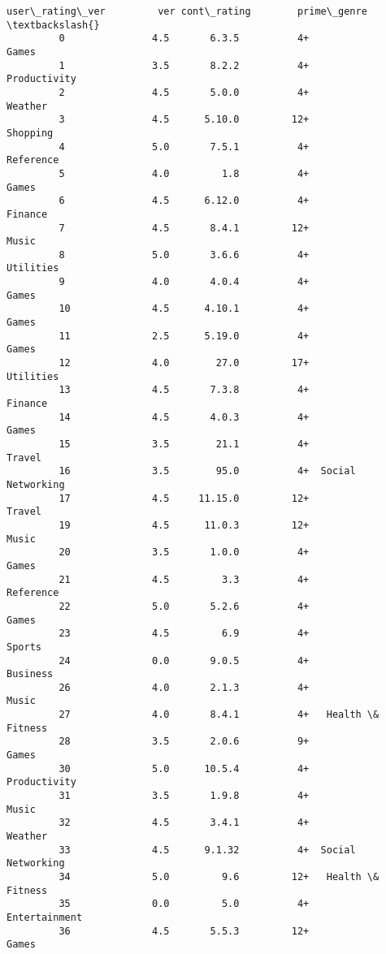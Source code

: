 \documentclass[11pt]{article}
\begin{document}
\begin{Verbatim}[commandchars=\\\{\}]
             user\_rating\_ver         ver cont\_rating        prime\_genre  \textbackslash{}
         0               4.5       6.3.5          4+              Games   
         1               3.5       8.2.2          4+       Productivity   
         2               4.5       5.0.0          4+            Weather   
         3               4.5      5.10.0         12+           Shopping   
         4               5.0       7.5.1          4+          Reference   
         5               4.0         1.8          4+              Games   
         6               4.5      6.12.0          4+            Finance   
         7               4.5       8.4.1         12+              Music   
         8               5.0       3.6.6          4+          Utilities   
         9               4.0       4.0.4          4+              Games   
         10              4.5      4.10.1          4+              Games   
         11              2.5      5.19.0          4+              Games   
         12              4.0        27.0         17+          Utilities   
         13              4.5       7.3.8          4+            Finance   
         14              4.5       4.0.3          4+              Games   
         15              3.5        21.1          4+             Travel   
         16              3.5        95.0          4+  Social Networking   
         17              4.5     11.15.0         12+             Travel   
         19              4.5      11.0.3         12+              Music   
         20              3.5       1.0.0          4+              Games   
         21              4.5         3.3          4+          Reference   
         22              5.0       5.2.6          4+              Games   
         23              4.5         6.9          4+             Sports   
         24              0.0       9.0.5          4+           Business   
         26              4.0       2.1.3          4+              Music   
         27              4.0       8.4.1          4+   Health \& Fitness   
         28              3.5       2.0.6          9+              Games   
         30              5.0      10.5.4          4+       Productivity   
         31              3.5       1.9.8          4+              Music   
         32              4.5       3.4.1          4+            Weather   
         33              4.5      9.1.32          4+  Social Networking   
         34              5.0         9.6         12+   Health \& Fitness   
         35              0.0         5.0          4+      Entertainment   
         36              4.5       5.5.3         12+              Games   

\end{Verbatim}
\end{document}
